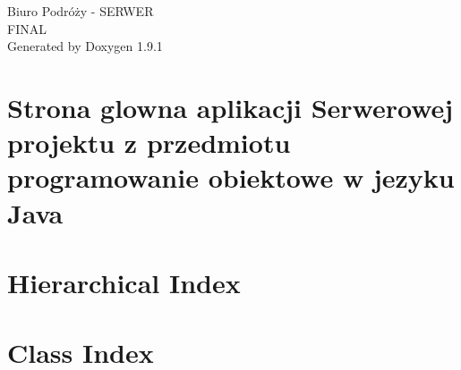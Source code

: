 \let\mypdfximage\pdfximage\def\pdfximage{\immediate\mypdfximage}\documentclass[twoside]{book}
\newcommand{\+}{\discretionary{\mbox{\scriptsize$\hookleftarrow$}}{}{}}
\newcommand{\clearemptydoublepage}{%
  \newpage{\pagestyle{empty}\cleardoublepage}%
}
\begin{document}
\raggedbottom

\hypersetup{pageanchor=false,
             bookmarksnumbered=true,
             pdfencoding=unicode
            }
\begin{titlepage}
\vspace*{7cm}
\begin{center}%
{\Large Biuro Podróży -\/ SERWER \\[1ex]\large FINAL }\\
\vspace*{1cm}
{\large Generated by Doxygen 1.9.1}\\
\end{center}
\end{titlepage}
\clearemptydoublepage
{}
\tableofcontents
\clearemptydoublepage
{}
\hypersetup{pageanchor=true}

\chapter{Strona glowna aplikacji Serwerowej projektu z przedmiotu programowanie obiektowe w jezyku Java}
\label{index}\hypertarget{index}{}
\chapter{Hierarchical Index}

\chapter{Class Index}

\end{document}

